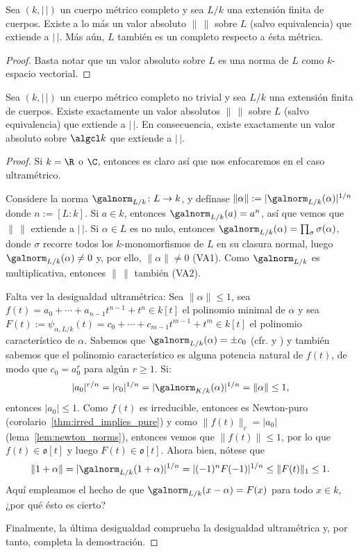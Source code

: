 \documentclass[teoria-numeros.tex]{subfiles}
\begin{document}
\begin{cor}
	Sea $(k, |\,|)$ un cuerpo métrico completo y sea $L/k$ una extensión finita de cuerpos.
	Existe a lo más un valor absoluto $\|\,\|$ sobre $L$ (salvo equivalencia) que extiende a $|\,|$.
	Más aún, $L$ también es un completo respecto a ésta métrica.
\end{cor}
\begin{proof}
	Basta notar que un valor absoluto sobre $L$ es una norma de $L$ como $k$-espacio vectorial.
\end{proof}

\begin{thmi}\label{thm:complete_metric_fld_algcl_metric}
	Sea $(k, |\,|)$ un cuerpo métrico completo no trivial y sea $L/k$ una extensión finita de cuerpos.
	Existe exactamente un valor absolutos $\|\,\|$ sobre $L$ (salvo equivalencia) que extiende a $|\,|$.
	En consecuencia, existe exactamente un valor absoluto sobre $\algcl k$ que extiende a $|\,|$.
\end{thmi}
\begin{proof}
	Si $k = \R$ o $\C$, entonces es claro así que nos enfocaremos en el caso ultramétrico.

	Considere la norma $\galnorm_{L/k}\colon L \to k$, y defínase $\|\alpha\| := |\galnorm_{L/k}(\alpha)|^{1/n}$ donde $n := [L : k]$.
	Si $a \in k$, entonces $\galnorm_{L/k}(a) = a^n$, así que vemos que $\|\,\|$ extiende a $|\,|$.
	Si $\alpha \in L$ es no nulo, entonces $\galnorm_{L/k}(\alpha) = \prod_{\sigma} \sigma(\alpha)$, donde $\sigma$ recorre todos los $k$-monomorfismos
	de $L$ en su clasura normal, luego $\galnorm_{L/k}(\alpha) \ne 0$ y, por ello, $\|\alpha\| \ne 0$ (VA1).
	Como $\galnorm_{L/k}$ es multiplicativa, entonces $\|\,\|$ también (VA2).

	Falta ver la desigualdad ultramétrica:
	Sea $\|\alpha\| \le 1$, sea $f(t) = a_0 + \cdots + a_{n-1}t^{n-1} + t^n \in k[t]$ el polinomio minimal de $\alpha$ y sea $F(t) :=
	\psi_{\alpha, L/k}(t) = c_0 + \cdots + c_{m-1}t^{m-1} + t^m \in k[t]$ el polinomio característico de $\alpha$.
	Sabemos que $\galnorm_{L/k}(\alpha) = \pm c_0$ (cfr. \cite[def.~4.63]{Alg} y \cite[prop.~3.67]{Alg}) y también sabemos que el polinomio característico
	es alguna potencia natural de $f(t)$, de modo que $c_0 = a_0^r$ para algún $r\ge 1$.
	Si:
	$$ |a_0|^{r/n} = |c_0|^{1/n} = |\galnorm_{K/k}(\alpha)|^{1/n} = \|\alpha\| \le 1, $$
	entonces $|a_0| \le 1$.
	Como $f(t)$ es irreducible, entonces es Newton-puro (corolario~\ref{thm:irred_implies_pure}) y como $\|f(t)\|_c = |a_0|$ (lema~\ref{lem:newton_norms}),
	entonces vemos que $\|f(t)\| \le 1$, por lo que $f(t) \in \mathfrak{o}[t]$ y luego $F(t) \in \mathfrak{o}[t]$.
	Ahora bien, nótese que
	$$ \|1 + \alpha\| = |\galnorm_{L/k}(1 + \alpha)|^{1/n} = |(-1)^n F(-1)|^{1/n} \le \|F(t)\|_1 \le 1. $$
	Aquí empleamos el hecho de que $\galnorm_{L/k}(x - \alpha) = F(x)$ para todo $x \in k$, ¿por qué ésto es cierto?

	Finalmente, la última desigualdad comprueba la desigualdad ultramétrica y, por tanto, completa la demostración.
\end{proof}
\end{document}
